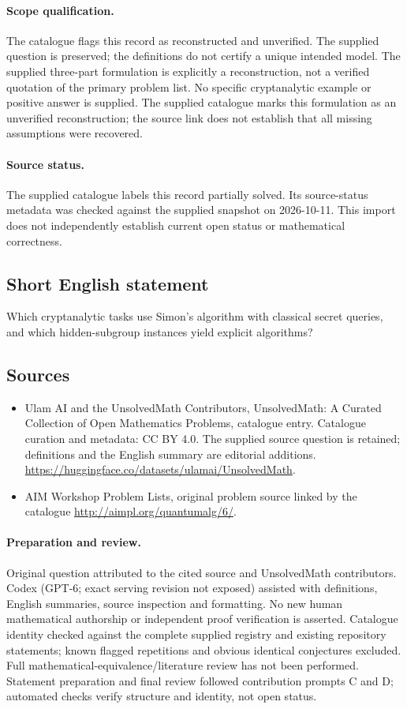 \documentclass[11pt]{article}
\begin{document}
\paragraph{Scope qualification.}
The catalogue flags this record as reconstructed and unverified. The supplied question is preserved; the definitions do not certify a unique intended model. The supplied three-part formulation is explicitly a reconstruction, not a verified quotation of the primary problem list. No specific cryptanalytic example or positive answer is supplied.
The supplied catalogue marks this formulation as an unverified reconstruction; the source link does not establish that all missing assumptions were recovered.
\paragraph{Source status.}
The supplied catalogue labels this record partially solved. Its source-status metadata was checked against the supplied snapshot on 2026-10-11. This import does not independently establish current open status or mathematical correctness.
\subsection{Short English statement}
Which cryptanalytic tasks use Simon's algorithm with classical secret queries, and which hidden-subgroup instances yield explicit algorithms?
\subsection{Sources}
\begin{itemize}
\item[S1] Ulam AI and the UnsolvedMath Contributors, UnsolvedMath: A Curated Collection of Open Mathematics Problems, catalogue entry. Catalogue curation and metadata: CC BY 4.0. The supplied source question is retained; definitions and the English summary are editorial additions.
\url{https://huggingface.co/datasets/ulamai/UnsolvedMath}.
\item[S2] AIM Workshop Problem Lists, original problem source linked by the catalogue
\url{http://aimpl.org/quantumalg/6/}.
\end{itemize}
\paragraph{Preparation and review.}
Original question attributed to the cited source and UnsolvedMath contributors. Codex (GPT-6; exact serving revision not exposed) assisted with definitions, English summaries, source inspection and formatting. No new human mathematical authorship or independent proof verification is asserted. Catalogue identity checked against the complete supplied registry and existing repository statements; known flagged repetitions and obvious identical conjectures excluded. Full mathematical-equivalence/literature review has not been performed. Statement preparation and final review followed contribution prompts C and D; automated checks verify structure and identity, not open status.
\label{end:statement}
\end{document}
